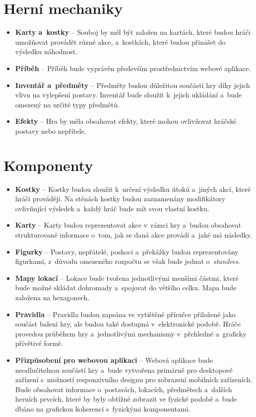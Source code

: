 \section{Herní mechaniky}
\label{sec:req_mechanics}

\begin{itemize}
    \item \textbf{Karty a~kostky} -- 
        Souboj by měl být založen na kartách, které budou hráči umožňovat provádět různé akce, a~kostkách, které budou přinášet do výsledku náhodnost.
    \item \textbf{Příběh} -- 
        Příběh bude vyprávěn především prostřednictvím webové aplikace.
    \item \textbf{Inventář a~předměty} -- 
        Předměty budou důležitou součástí hry díky jejich vlivu na vylepšení postavy. Inventář bude sloužit k~jejich ukládání a~bude omezený na určité typy předmětů.
    \item \textbf{Efekty} -- 
        Hra by měla obsahovat efekty, které mohou ovlivňovat hráčské postavy nebo nepřítele.
\end{itemize}

\section{Komponenty}
\label{sec:req_components}

\begin{itemize}
    \item \textbf{Kostky} -- 
        Kostky budou sloužit k~určení výsledku útoků a~jiných akcí, které hráči provádějí. Na stěnách kostky budou zaznamenány modifikátory ovlivňující výsledek a~každý hráč bude mít svou vlastní kostku.
    \item \textbf{Karty} --
        Karty budou reprezentovat akce v~rámci hry a~budou obsahovat strukturované informace o~tom, jak se daná akce provádí a~jaké má následky.
    \item \textbf{Figurky} --
        Postavy, nepřátelé, poskoci a~překážky budou reprezentovány figurkami, z~důvodu omezeného rozpočtu se však bude jednat o~\textit{standees}.
    \item \textbf{Mapy lokací} --
        Lokace bude tvořena jednotlivými menšími částmi, které bude možné skládat dohromady a~spojovat do většího celku. Mapa bude založena na hexagonech.
    \item \textbf{Pravidla} --
        Pravidla budou zapsána ve vytištěné příručce přiložené jako součást balení hry, ale budou také dostupná v~elektronické podobě. Hráče provedou průběhem hry a~jednotlivými mechanismy v~přehledné a~graficky přívětivé formě.
    \item \textbf{Přizpůsobení pro webovou aplikaci} --
        Webová aplikace bude neodlučitelnou součástí hry a~bude vytvořena primárně pro desktopové zařízení s~možností responzivního designu pro zobrazení mobilních zařízeních. Bude obsahovat informace o~postavách, lokacích, předmětech a~dalších herních prvcích, které by byly obtížné zobrazit ve fyzické podobě a~bude dbáno na grafickou koherenci s~fyzickými komponentami.
\end{itemize}
\pagebreak

